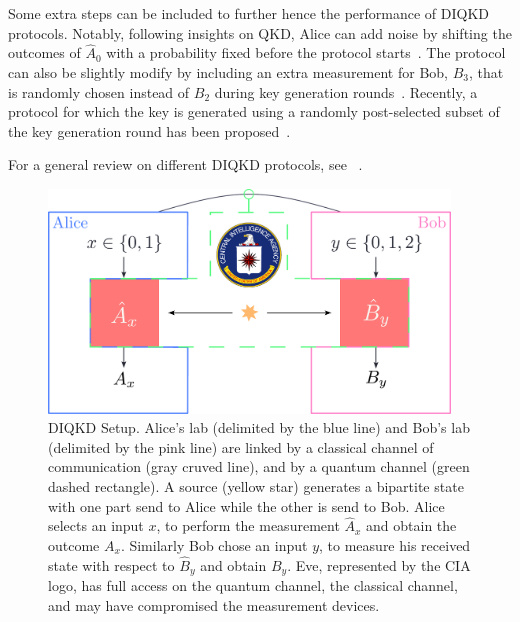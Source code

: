 Some extra steps can be included to further hence the performance of DIQKD protocols.
Notably, following insights on QKD, Alice can add noise by shifting the outcomes of $\hat{A}_0$ with a probability fixed before the protocol starts~\cite{Ho2020}. 
The protocol can also be slightly modify by including an extra measurement for Bob, $B_3$, that is randomly chosen instead of $B_2$ during key generation rounds~\cite{Schwonnek2021}. 
Recently, a protocol for which the key is generated using a randomly post-selected subset of the key generation round has been proposed~\cite{Xu2022}.

For a general review on different DIQKD protocols, see ~\cite{Primaatmaja2023}.


\begin{figure}
	\begin{center}
		\includegraphics[width=0.95\textwidth]{chapters/deviceindependent/img/setup.pdf}
	\end{center}
	\caption{DIQKD Setup. Alice's lab (delimited by the blue line) and Bob's lab (delimited by the pink line) are linked by a classical channel of communication (gray cruved line), and by a quantum channel (green dashed rectangle). A source (yellow star) generates a bipartite state with one part send to Alice while the other is send to Bob. Alice selects an input $x$, to perform the measurement $\hat{A}_x$ and obtain the outcome $A_x$. Similarly Bob chose an input $y$, to measure his
		received state with respect to $\hat{B}_y$ and obtain $B_y$.
	Eve, represented by the CIA logo, has full access on the quantum channel, the classical channel, and may have compromised the measurement devices. }
	\label{fig:DIQKD_setup}
\end{figure}

